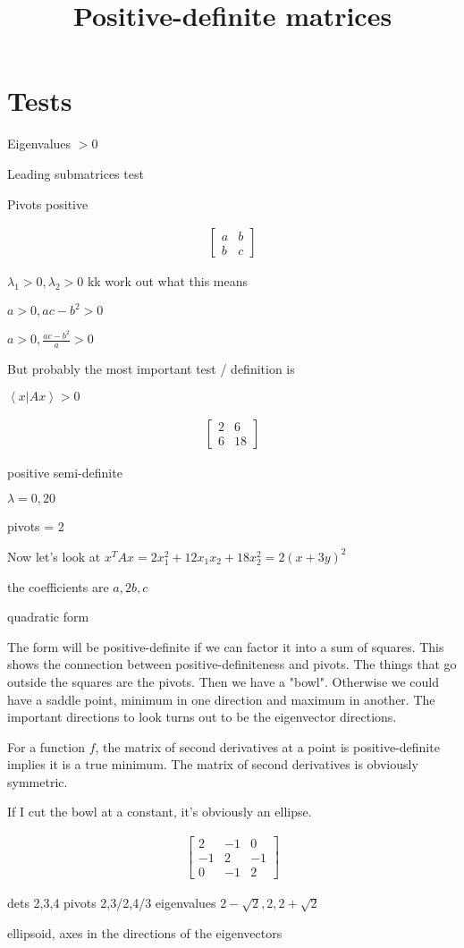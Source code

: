 \documentclass{article}
\title{Positive-definite matrices}
\date{}
\begin{document}
\maketitle

\section{Tests}

Eigenvalues $> 0$

Leading submatrices test

Pivots positive

\begin{align}
\begin{bmatrix}
a & b \\
b & c
\end{bmatrix}
\end{align}

$\lambda_1 > 0, \lambda_2 > 0$ kk work out what this means

$a > 0, ac - b^2 > 0$

$a > 0, \frac{ac - b^2}{a} > 0$

But probably the most important test / definition is

$\left<x | A x\right> > 0$

\begin{align}
\begin{bmatrix}
2 & 6 \\
6 & 18
\end{bmatrix}
\end{align}

positive semi-definite

$\lambda = 0, 20$

pivots = 2

Now let's look at $x^T Ax = 2x_1^2 + 12 x_1x_2 + 18 x_2^2 = 2(x+3y)^2$

the coefficients are $a, 2b, c$

quadratic form

The form will be positive-definite if we can factor it into a sum of squares. This shows the connection between positive-definiteness and pivots. The things that go outside the squares are the pivots. Then we have a "bowl". Otherwise we could have a saddle point, minimum in one direction and maximum in another. The important directions to look turns out to be the eigenvector directions.

For a function $f$, the matrix of second derivatives at a point is positive-definite implies it is a true minimum. The matrix of second derivatives is obviously symmetric.

If I cut the bowl at a constant, it's obviously an ellipse.

\begin{align}
\begin{bmatrix}
2 & -1 & 0 \\
-1 & 2 & -1 \\
0 & -1 & 2
\end{bmatrix}
\end{align}

dets 2,3,4
pivots 2,3/2,4/3
eigenvalues $2-\sqrt 2, 2, 2+\sqrt 2$

ellipsoid, axes in the directions of the eigenvectors
\end{document}
